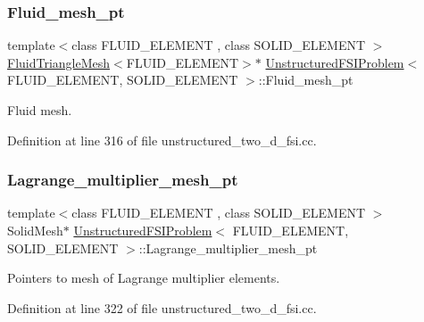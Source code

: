 \subsubsection{\texorpdfstring{Fluid\+\_\+mesh\+\_\+pt}{Fluid\_mesh\_pt}}
{\footnotesize\ttfamily template$<$class F\+L\+U\+I\+D\+\_\+\+E\+L\+E\+M\+E\+NT , class S\+O\+L\+I\+D\+\_\+\+E\+L\+E\+M\+E\+NT $>$ \\
\hyperlink{classFluidTriangleMesh}{Fluid\+Triangle\+Mesh}$<$F\+L\+U\+I\+D\+\_\+\+E\+L\+E\+M\+E\+NT$>$$\ast$ \hyperlink{classUnstructuredFSIProblem}{Unstructured\+F\+S\+I\+Problem}$<$ F\+L\+U\+I\+D\+\_\+\+E\+L\+E\+M\+E\+NT, S\+O\+L\+I\+D\+\_\+\+E\+L\+E\+M\+E\+NT $>$\+::Fluid\+\_\+mesh\+\_\+pt\hspace{0.3cm}{\ttfamily [private]}}



Fluid mesh. 



Definition at line 316 of file unstructured\+\_\+two\+\_\+d\+\_\+fsi.\+cc.

\mbox{\label{classUnstructuredFSIProblem_ab30c2bc8de791e91d0bba19b048b5219}} 
\subsubsection{\texorpdfstring{Lagrange\+\_\+multiplier\+\_\+mesh\+\_\+pt}{Lagrange\_multiplier\_mesh\_pt}}
{\footnotesize\ttfamily template$<$class F\+L\+U\+I\+D\+\_\+\+E\+L\+E\+M\+E\+NT , class S\+O\+L\+I\+D\+\_\+\+E\+L\+E\+M\+E\+NT $>$ \\
Solid\+Mesh$\ast$ \hyperlink{classUnstructuredFSIProblem}{Unstructured\+F\+S\+I\+Problem}$<$ F\+L\+U\+I\+D\+\_\+\+E\+L\+E\+M\+E\+NT, S\+O\+L\+I\+D\+\_\+\+E\+L\+E\+M\+E\+NT $>$\+::Lagrange\+\_\+multiplier\+\_\+mesh\+\_\+pt\hspace{0.3cm}{\ttfamily [private]}}



Pointers to mesh of Lagrange multiplier elements. 



Definition at line 322 of file unstructured\+\_\+two\+\_\+d\+\_\+fsi.\+cc.

